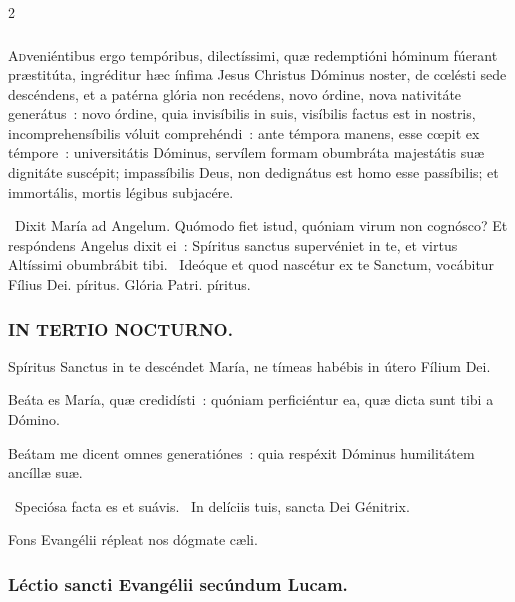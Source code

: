 \documentclass[9pt,twoside]{extarticle}
\begin{document}
\begin{multicols}{2}
\subsubsection*{\center {}}
\lettrine{A}dveniéntibus ergo tempóribus, dilectíssimi, quæ redemptióni hóminum fúerant præstitúta, ingréditur hæc ínfima Jesus Christus Dóminus noster, de cœlésti sede descéndens, et a patérna glória non recédens, novo órdine, nova nativitáte generátus~: novo órdine, quia invisíbilis in suis, visíbilis factus est in nostris, incomprehensíbilis vóluit comprehéndi~: ante témpora manens, esse cœpit ex témpore~: universitátis Dóminus, servílem formam obumbráta majestátis suæ dignitáte suscépit; impassíbilis Deus, non dedignátus est homo esse passíbilis; et immortális, mortis légibus subjacére.

\begin{tightlist}{}
\item {}~Dixit María ad Angelum. Quómodo fiet istud, quóniam virum non cognósco? Et respóndens Angelus dixit ei~: \textred{*} Spíritus sanctus supervéniet in te, et virtus Altíssimi obumbrábit tibi. ~Ideóque et quod nascétur ex te Sanctum, vocábitur Fílius Dei. píritus. Glória Patri. píritus.
\end{tightlist}

\subsubsection*{\center \textsc{IN TERTIO NOCTURNO.}}
\begin{tightlist}{}
\item {} Spíritus Sanctus in te descéndet María, ne tímeas habébis in útero Fílium Dei.
\item {} Beáta es María, quæ credidísti~: quóniam perficiéntur ea, quæ dicta sunt tibi a Dómino.
\item {} Beátam me dicent omnes generatiónes~: quia respéxit Dóminus humilitátem ancíllæ suæ.
\item {}~Speciósa facta es et suávis. ~In delíciis tuis, sancta Dei Génitrix.
\item {\small {} Fons Evangélii répleat nos dógmate cæli.}
\end{tightlist}

\subsubsection*{\center Léctio sancti Evangélii secúndum Lucam.}

\end{multicols}
\end{document}
